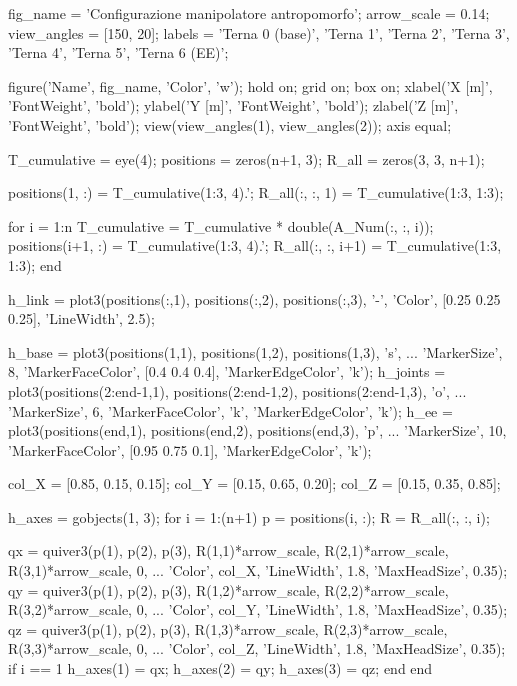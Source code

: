 \documentclass[11pt, a4paper]{article}
\begin{document}
\newpage
{}

\begin{matlabcode}
fig_name    = 'Configurazione manipolatore antropomorfo';
arrow_scale = 0.14;
view_angles = [150, 20];
labels      = {'Terna 0 (base)', 'Terna 1', 'Terna 2', 'Terna 3', 'Terna 4', 'Terna 5', 'Terna 6 (EE)'};

figure('Name', fig_name, 'Color', 'w');
hold on;
grid on;
box on;
xlabel('X [m]', 'FontWeight', 'bold');
ylabel('Y [m]', 'FontWeight', 'bold');
zlabel('Z [m]', 'FontWeight', 'bold');
view(view_angles(1), view_angles(2));
axis equal;

T_cumulative = eye(4);
positions = zeros(n+1, 3);
R_all     = zeros(3, 3, n+1);

positions(1, :) = T_cumulative(1:3, 4).';
R_all(:, :, 1)  = T_cumulative(1:3, 1:3);

for i = 1:n
    T_cumulative = T_cumulative * double(A_Num(:, :, i));
    positions(i+1, :) = T_cumulative(1:3, 4).';
    R_all(:, :, i+1)  = T_cumulative(1:3, 1:3);
end

h_link = plot3(positions(:,1), positions(:,2), positions(:,3), '-',  'Color', [0.25 0.25 0.25], 'LineWidth', 2.5);

h_base = plot3(positions(1,1), positions(1,2), positions(1,3), 's', ...
    'MarkerSize', 8, 'MarkerFaceColor', [0.4 0.4 0.4], 'MarkerEdgeColor', 'k');
h_joints = plot3(positions(2:end-1,1), positions(2:end-1,2), positions(2:end-1,3), 'o', ...
    'MarkerSize', 6, 'MarkerFaceColor', 'k', 'MarkerEdgeColor', 'k');
h_ee = plot3(positions(end,1), positions(end,2), positions(end,3), 'p', ...
    'MarkerSize', 10, 'MarkerFaceColor', [0.95 0.75 0.1], 'MarkerEdgeColor', 'k');

col_X = [0.85, 0.15, 0.15];
col_Y = [0.15, 0.65, 0.20];
col_Z = [0.15, 0.35, 0.85];

h_axes = gobjects(1, 3);
for i = 1:(n+1)
    p = positions(i, :);
    R = R_all(:, :, i);

    qx = quiver3(p(1), p(2), p(3), R(1,1)*arrow_scale, R(2,1)*arrow_scale, R(3,1)*arrow_scale, 0, ...
        'Color', col_X, 'LineWidth', 1.8, 'MaxHeadSize', 0.35);
    qy = quiver3(p(1), p(2), p(3), R(1,2)*arrow_scale, R(2,2)*arrow_scale, R(3,2)*arrow_scale, 0, ...
        'Color', col_Y, 'LineWidth', 1.8, 'MaxHeadSize', 0.35);
    qz = quiver3(p(1), p(2), p(3), R(1,3)*arrow_scale, R(2,3)*arrow_scale, R(3,3)*arrow_scale, 0, ...
        'Color', col_Z, 'LineWidth', 1.8, 'MaxHeadSize', 0.35);
    if i == 1
        h_axes(1) = qx;
        h_axes(2) = qy;
        h_axes(3) = qz;
    end
end
\end{matlabcode}
\end{document}
